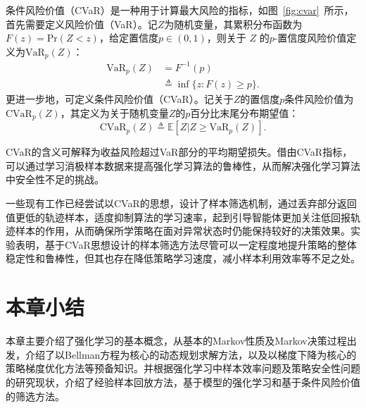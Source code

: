 条件风险价值（CVaR）是一种用于计算最大风险的指标，如图~\ref{fig:cvar}~所示，首先需要定义风险价值（VaR）。记$Z$为随机变量，其累积分布函数为$F(z)=\mathrm{Pr}(Z<z)$，给定置信度$p \in (0,1)$，则关于 $Z$ 的$p$-置信度风险价值定义为$\mathrm{VaR}_p(Z)$：
\begin{equation}
\begin{aligned}
    \mathrm{VaR}_p(Z)&=F^{-1}(p)\\
    &\triangleq \inf\{z:F(z)\geq p\}.
\end{aligned}
\end{equation}
更进一步地，可定义条件风险价值（CVaR）。记关于$Z$的置信度$p$条件风险价值为$\mathrm{CVaR}_p(Z)$，其定义为关于随机变量$Z$的$p$百分比末尾分布期望值：
\begin{equation}\label{eq:def-cvar}
    \mathrm{CVaR}_p(Z)\triangleq \mathbb{E}[Z|Z\geq \mathrm{VaR}_p(Z)].
\end{equation}

CVaR的含义可解释为收益风险超过VaR部分的平均期望损失\cite{rockafellar2002conditional}。借由CVaR指标，可以通过学习消极样本数据来提高强化学习算法的鲁棒性，从而解决强化学习算法中安全性不足的挑战。

一些现有工作已经尝试以CVaR的思想，设计了样本筛选机制\cite{rajeswaran2016epopt}，通过丢弃部分返回值更低的轨迹样本，适度抑制算法的学习速率，起到引导智能体更加关注低回报轨迹样本的作用，从而确保所学策略在面对异常状态时仍能保持较好的决策效果。实验表明，基于CVaR思想设计的样本筛选方法尽管可以一定程度地提升策略的整体稳定性和鲁棒性，但其也存在降低策略学习速度，减小样本利用效率等不足之处\cite{Tamar2015OptimizingSampling}。

\section{本章小结}

本章主要介绍了强化学习的基本概念，从基本的Markov性质及Markov决策过程出发，介绍了以Bellman方程为核心的动态规划求解方法，以及以梯度下降为核心的策略梯度优化方法等预备知识。并根据强化学习中样本效率问题及策略安全性问题的研究现状，介绍了经验样本回放方法，基于模型的强化学习和基于条件风险价值的筛选方法。